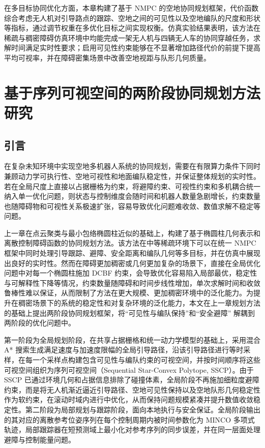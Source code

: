 在多目标协同优化方面，本章构建了基于 NMPC 的空地协同规划框架，代价函数综合考虑无人机对引导路点的跟踪、空地之间的可见性以及空地编队的尺度和形状等指标，通过调节权重在多优化目标之间实现权衡。仿真实验结果表明，该方法在稀疏与稠密障碍仿真环境中均能完成一架无人机与四辆无人车的协同穿越任务，求解时间满足实时性要求；启用可见性约束能够在不显著增加路径代价的前提下提高平均可视率，并在障碍密集场景中改善空地视距与队形几何质量。

\chapter{基于序列可视空间的两阶段协同规划方法研究}

\section{引言}

在复杂未知环境中实现空地多机器人系统的协同规划，需要在有限算力条件下同时兼顾动力学可执行性、空地可视性和地面编队稳定性，并保证整体规划的实时性。若在全局尺度上直接以占据栅格为约束，将避障约束、可视性约束和多机耦合统一纳入单一优化问题，则状态与控制维度会随时间和机器人数量急剧增长，约束数量也随障碍物和可视性关系极速扩张，容易导致优化问题难收敛、数值求解不稳定等问题。

上一章在点云聚类与最小包络椭圆柱近似的基础上，构建了基于椭圆柱几何表示和离散控制障碍函数的协同规划方法。该方法在中等稀疏环境下可以在统一 NMPC 框架中同时处理引导跟踪、避障、安全距离和编队几何等多目标，并在仿真中展现出良好的实时性。然而在障碍更加稠密或几何更加复杂的场景下，直接在全局优化问题中对每一个椭圆柱施加 DCBF 约束，会导致优化容易陷入局部最优，稳定性与可解释性下降等情况，约束数量随障碍和时间步线性增加，单次求解时间和收敛鲁棒性难以保证，从而限制了方法在更大规模、更加稠密环境中的泛化能力。为提升在稠密场景下的系统的稳定性和对复杂环境的泛化能力，本文在上一章规划方法的基础上提出两阶段协同规划框架，将“可见性与编队保持”和“安全避障” 解耦到两阶段的优化问题中。

第一阶段为全局规划阶段，在共享占据栅格和统一动力学模型的基础上，采用混合 A* 搜索生成满足速度与加速度限幅的全局引导路径，沿该引导路径进行等时采样，在每一个采样点构建包含可见性与编队约束的可视空间，并按时间顺序将这些可视空间组织为序列可视空间（Sequential Star-Convex Polytope, SSCP）。由于 SSCP 已通过环境几何和占据信息排除了碰撞体素，全局阶段不再施加细粒度避障约束，而是将无人机渐近逼近引导路径、空地可见性保持以及空地队形几何稳定性作为软约束，在滚动时域内进行中优化，从而保持问题规模紧凑并提升数值收敛稳定性。第二阶段为局部规划与跟踪阶段，面向本地执行与安全保证。全局阶段输出的其对应的离散参考位姿序列在每个控制周期内被时间参数化为 MINCO \cite{wang2022geometrically}多项式轨迹，局部跟踪器在短预测域上最小化对参考序列的同步误差，并在同一层面处理避障与控制能量问题。

